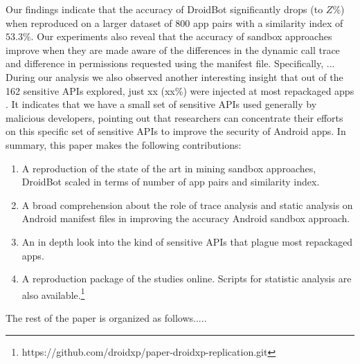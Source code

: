 Our findings indicate that the accuracy of DroidBot significantly drops (to $Z\%$) when reproduced on a larger dataset of $800$ app pairs with a similarity index of $53.3\%$. Our experiments also reveal that the accuracy of sandbox approaches improve when they are made aware of the differences in the dynamic call trace and difference in permissions requested using the manifest file. Specifically, ... 
During our analysis we also observed another interesting insight that out of the 162 sensitive APIs explored, just xx (xx\%) were injected at most repackaged apps . It indicates that we have a small set of sensitive APIs used generally by malicious developers, pointing out that researchers can concentrate their efforts on this specific set of sensitive APIs to improve the security of Android apps. 
In summary, this paper makes the following contributions:

\begin{enumerate}[1.]
\item A reproduction of the state of the art in mining sandbox approaches, DroidBot scaled in terms of number of app pairs and similarity index.
\item A broad comprehension about the role of trace analysis and static analysis on Android manifest files in improving the accuracy Android sandbox approach.
\item An in depth look into the kind of sensitive APIs that plague most repackaged apps.
\item A reproduction package of the studies online. Scripts for statistic analysis are also available.\footnote{https://github.com/droidxp/paper-droidxp-replication.git}
\end{enumerate}


The rest of the paper is organized as follows.....




